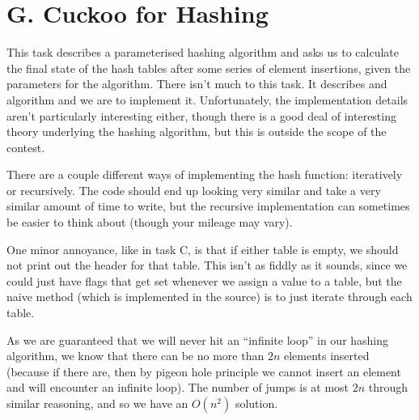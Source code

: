 \section*{G. Cuckoo for Hashing}

This task describes a parameterised hashing algorithm and asks us to calculate
the final state of the hash tables after some series of element insertions,
given the parameters for the algorithm. There isn't much to this task. It
describes and algorithm and we are to implement it. Unfortunately, the
implementation details aren't particularly interesting either, though there is
a good deal of interesting theory underlying the hashing algorithm, but this is
outside the scope of the contest.

There are a couple different ways of implementing the hash function:
iteratively or recursively. The code should end up looking very similar and
take a very similar amount of time to write, but the recursive implementation
can sometimes be easier to think about (though your mileage may vary).

One minor annoyance, like in task C, is that if either table is empty, we
should not print out the header for that table. This isn't as fiddly as it
sounds, since we could just have flags that get set whenever we assign a value
to a table, but the naive method (which is implemented in the source) is to
just iterate through each table.

As we are guaranteed that we will never hit an ``infinite loop'' in our hashing
algorithm, we know that there can be no more than $2n$ elements inserted
(because if there are, then by pigeon hole principle we cannot insert an
element and will encounter an infinite loop). The number of jumps is at most
$2n$ through similar reasoning, and so we have an $O(n^2)$ solution.
